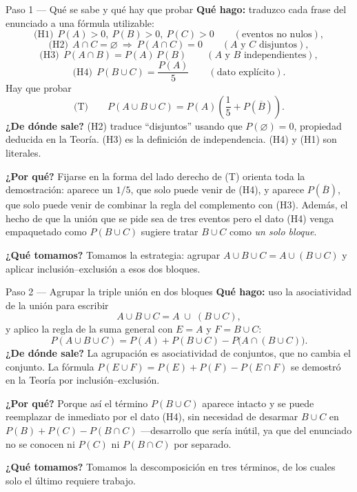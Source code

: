 \documentclass[11pt]{article}
\begin{document}
\begin{sol}
\begin{paso}{Paso 1 --- Qué se sabe y qué hay que probar}
\textbf{Qué hago:} traduzco cada frase del enunciado a una fórmula utilizable:
\[
\text{(H1)}\ \ P(A)>0,\ P(B)>0,\ P(C)>0 \qquad(\text{eventos no nulos}),
\]
\[
\text{(H2)}\ \ A\cap C=\varnothing\ \Longrightarrow\ P(A\cap C)=0
\qquad(\text{$A$ y $C$ disjuntos}),
\]
\[
\text{(H3)}\ \ P(A\cap B)=P(A)\,P(B)
\qquad(\text{$A$ y $B$ independientes}),
\]
\[
\text{(H4)}\ \ P(B\cup C)=\frac{P(A)}{5}
\qquad(\text{dato explícito}).
\]
Hay que probar
\[
\text{(T)}\qquad
P(A\cup B\cup C)=P(A)\left(\frac{1}{5}+P(\overline{B})\right).
\]
\textbf{¿De dónde sale?} (H2) traduce ``disjuntos'' usando que $P(\varnothing)=0$, propiedad
deducida en la Teoría. (H3) es la definición de independencia. (H4) y (H1) son literales.

\textbf{¿Por qué?} Fijarse en la forma del lado derecho de (T) orienta toda la demostración:
aparece un $1/5$, que solo puede venir de (H4), y aparece $P(\overline{B})$, que solo puede
venir de combinar la regla del complemento con (H3). Además, el hecho de que la unión que se
pide sea de tres eventos pero el dato (H4) venga empaquetado como $P(B\cup C)$ sugiere tratar
$B\cup C$ como \emph{un solo bloque}.

\textbf{¿Qué tomamos?} Tomamos la estrategia: agrupar $A\cup B\cup C=A\cup(B\cup C)$ y aplicar
inclusión--exclusión a esos dos bloques.
\end{paso}

\begin{paso}{Paso 2 --- Agrupar la triple unión en dos bloques}
\textbf{Qué hago:} uso la asociatividad de la unión para escribir
\[
A\cup B\cup C=A\;\cup\;(B\cup C),
\]
y aplico la regla de la suma general con $E=A$ y $F=B\cup C$:
\[
P(A\cup B\cup C)=P(A)+P(B\cup C)-P\bigl(A\cap(B\cup C)\bigr).
\]
\textbf{¿De dónde sale?} La agrupación es asociatividad de conjuntos, que no cambia el
conjunto. La fórmula $P(E\cup F)=P(E)+P(F)-P(E\cap F)$ se demostró en la Teoría por
inclusión--exclusión.

\textbf{¿Por qué?} Porque así el término $P(B\cup C)$ aparece intacto y se puede reemplazar de
inmediato por el dato (H4), sin necesidad de desarmar $B\cup C$ en $P(B)+P(C)-P(B\cap C)$
---desarrollo que sería inútil, ya que del enunciado no se conocen ni $P(C)$ ni $P(B\cap C)$
por separado.

\textbf{¿Qué tomamos?} Tomamos la descomposición en tres términos, de los cuales solo el
último requiere trabajo.
\end{paso}


\end{sol}
\end{document}

